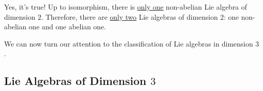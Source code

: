 Yes, it's true! Up to isomorphism, there is \underline{only one} non-abelian Lie algebra of dimension $2$. Therefore, there are \underline{only two} Lie algebras of dimension $2$: one non-abelian one and one abelian one.

We can now turn our attention to the classification of Lie algebras in dimension $3$.

\subsection{Lie Algebras of Dimension $3$}


